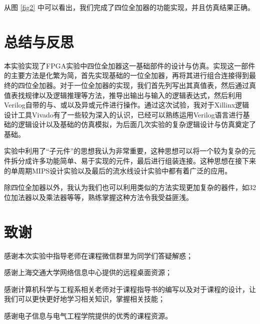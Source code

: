 \documentclass{cumcm}
\numberwithin{equation}{section}
\numberwithin{equation}{subsection}
\begin{document}
从图 \ref{fig2} 中可以看出，我们完成了四位全加器的功能实现，并且仿真结果正确。

\section{总结与反思}\label{section5}

本实验实现了FPGA实验中四位全加器这一基础部件的设计与仿真。实现这一部件的主要方法是化繁为简，首先实现基础的一位全加器，再将其进行组合连接得到最终的四位全加器。对于一位全加器的实现，我们首先列写出其真值表，然后通过真值表找规律以及逻辑推理等方法，推导出输出与输入的逻辑表达式，然后利用Verilog自带的与、或以及异或元件进行操作。通过这次试验，我对于Xillinx逻辑设计工具Vivado有了一些较为深入的认识，已经可以熟练运用Verilog语言进行基础的逻辑设计以及基础的仿真模拟，为后面几次实验的复杂逻辑设计与仿真奠定了基础。

实验中利用了“子元件”的思想我认为非常重要，这种思想可以将一个较为复杂的元件拆分成许多功能简单、易于实现的元件，最后进行组装连接。这种思想在接下来的单周期MIPS设计实验以及最后的流水线设计实验中都有着广泛的应用。

除四位全加器以外，我认为我们也可以利用类似的方法实现更加复杂的器件，如32位加法器以及乘法器等等，熟练掌握这种方法令我受益匪浅。

\section{致谢}\label{section6}
感谢本次实验中指导老师在课程微信群里为同学们答疑解惑；

感谢上海交通大学网络信息中心提供的远程桌面资源；

感谢计算机科学与工程系相关老师对于课程指导书的编写以及对于课程的设计，让我们可以更快更好地学习相关知识，掌握相关技能；

感谢电子信息与电气工程学院提供的优秀的课程资源。
%
%
\end{document}
